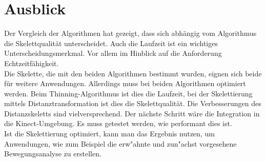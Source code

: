 \section{Ausblick}
Der Vergleich der Algorithmen hat gezeigt, dass sich abhängig vom Algorithmus die Skelettqualität unterscheidet. Auch die 
Laufzeit ist ein wichtiges Unterscheidungsmerkmal. Vor allem im Hinblick auf die Anforderung Echtzeitfähigkeit.\\
Die Skelette, die mit den beiden Algorithmen bestimmt wurden, eignen sich beide für weitere Anwendungen. Allerdings muss bei beiden Algorithmen optimiert werden. Beim Thinning-Algorithmus ist dies die Laufzeit, bei der Skelettierung mittels Distanztransformation ist dies die Skelettqualität. Die Verbesserungen des Distanzskeletts sind vielversprechend. Der nächste Schritt wäre die Integration in die Kinect-Umgebung. Es muss
getestet werden, wie performant dies ist. \\ Ist die Skelettierung optimiert, kann man das Ergebnis nutzen, um Anwendungen, wie zum Beispiel die erw"ahnte und zun"achst vorgesehene Bewegungsanalyse zu erstellen.